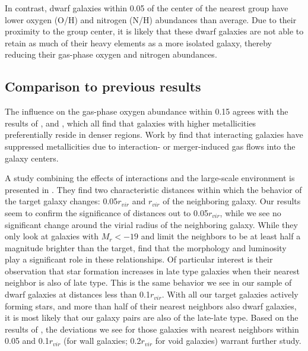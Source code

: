In contrast, dwarf galaxies within 0.05 \hMpc of the center of the nearest group 
have lower oxygen (O/H) and nitrogen (N/H) abundances than average.  Due to 
their proximity to the group center, it is likely that these dwarf galaxies are 
not able to retain as much of their heavy elements as a more isolated galaxy, 
thereby reducing their gas-phase oxygen and nitrogen abundances.


\subsection{Comparison to previous results}

The influence on the gas-phase oxygen abundance within 0.15 \hMpc agrees with 
the results of \cite{Shields91,Pustilnik06,Cooper08,Ellison09,Pustilnik11a,
Pustilnik14}, and \cite{SanchezAlmeida16}, which all find that galaxies with 
higher metallicities preferentially reside in denser regions.  Work by 
\cite{Rupke08} find that interacting galaxies have suppressed metallicities due 
to interaction- or merger-induced gas flows into the galaxy centers.

A study combining the effects of interactions and the large-scale environment is 
presented in \cite{Park09}.  They find two characteristic distances within which 
the behavior of the target galaxy changes: 0.05$r_{vir}$ and $r_{vir}$ of the 
neighboring galaxy.  Our results seem to confirm the significance of distances 
out to 0.05$r_{vir}$, while we see no significant change around the virial 
radius of the neighboring galaxy.  While they only look at galaxies with 
$M_r < -19$ and limit the neighbors to be at least half a magnitude brighter 
than the target, \cite{Park09} find that the morphology and luminosity play a 
significant role in these relationships.  Of particular interest is their 
observation that star formation increases in late type galaxies when their 
nearest neighbor is also of late type.  This is the same behavior we see in our 
sample of dwarf galaxies at distances less than 0.1$r_{vir}$.  With all our 
target galaxies actively forming stars, and more than half of their nearest 
neighbors also dwarf galaxies, it is most likely that our galaxy pairs are also 
of the late-late type.  Based on the results of \cite{Park09}, the deviations we 
see for those galaxies with nearest neighbors within 0.05 \hMpc and 
0.1$r_{vir}$ (for wall galaxies; 0.2$r_{vir}$ for void galaxies) warrant further 
study.





